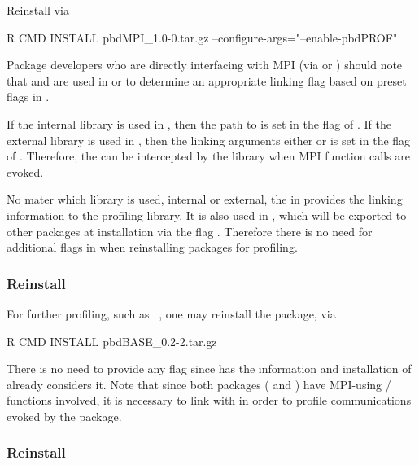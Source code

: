 Reinstall  via
\begin{Command}
R CMD INSTALL pbdMPI_1.0-0.tar.gz --configure-args="--enable-pbdPROF"
\end{Command}
Package developers who are directly interfacing with MPI (via  or ) 
should note that  and  are
used in  or  to determine an
appropriate linking flag  based on preset flags in
.

If the internal library is used in ,
then the path to  is set in the flag
 of .
If the external library is used in ,
then the linking arguments either  or
 is set
in the flag  of .
Therefore, the  can be intercepted by the  library
when MPI function calls are evoked.

No mater which library is used, internal or external, the 
in  provides the linking information to the
profiling library. It is also used in , which will be
exported to other  packages at installation via the flag
.  Therefore there is no need for additional flags in
 when reinstalling packages for profiling.

\subsubsection{Reinstall }
\label{sec:pbdBASE}

For further profiling, such as ~\citep{Schmidt2012pbdBASEpackage}, one may
reinstall the package, via
\begin{Command}
R CMD INSTALL pbdBASE_0.2-2.tar.gz
\end{Command}
There is no need to provide any flag since  has the
information and installation of  already considers it.
Note that since both packages ( and )
have MPI-using / functions involved, it
is necessary to link with  in order to profile communications
evoked by the package.


\subsubsection{Reinstall }
\label{sec:Rmpi}

